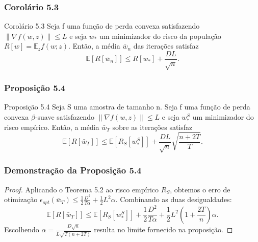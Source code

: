 \documentclass{beamer}
\newcommand{\EE}{\mathbb{E}}
\begin{document}
\begin{frame}
\frametitle{Corolário 5.3}
\begin{block}{Corolário 5.3}
Seja f uma função de perda convexa satisfazendo \(\|\nabla f(w,z)\| \le L\) e seja \(w_*\) um minimizador do risco da população \(R[w] = \EE_z f(w;z)\).  Então, a média \(\bar{w}_n\) das iterações satisfaz
$$ \EE[R[\bar{w}_n]] \le R[w_*] + \frac{DL}{\sqrt{n}}. $$ 
\end{block}
\end{frame}

\begin{frame}
\frametitle{Proposição 5.4}
\begin{block}{Proposição 5.4}
Seja S uma amostra de tamanho n. Seja f uma função de perda convexa \(\beta\)-suave satisfazendo \(\|\nabla f(w,z)\| \le L\) e seja \(w_*^S\) um minimizador do risco empírico.  Então, a média \(\bar{w}_T\) sobre as iterações satisfaz
$$ \EE[R[\bar{w}_T]] \le \EE[R_S[w_*^S]] + \frac{DL}{\sqrt{n}}\sqrt{\frac{n+2T}{T}}. $$ 
\end{block}
\end{frame}

\begin{frame}
\frametitle{Demonstração da Proposição 5.4}
\begin{proof}
Aplicando o Teorema 5.2 ao risco empírico \(R_S\), obtemos o erro de otimização \(\epsilon_{opt}(\bar{w}_T) \le \frac{1}{2}\frac{D^2}{T\alpha} + \frac{1}{2}L^2\alpha\).  Combinando as duas desigualdades:
$$ \EE[R[\bar{w}_T]] \le \EE[R_S[w_*^S]] + \frac{1}{2}\frac{D^2}{T\alpha} + \frac{1}{2}L^2(1+\frac{2T}{n})\alpha. $$ 
Escolhendo \(\alpha = \frac{D\sqrt{n}}{L\sqrt{T(n+2T)}}\) resulta no limite fornecido na proposição. 
\end{proof}
\end{frame}
\end{document}

